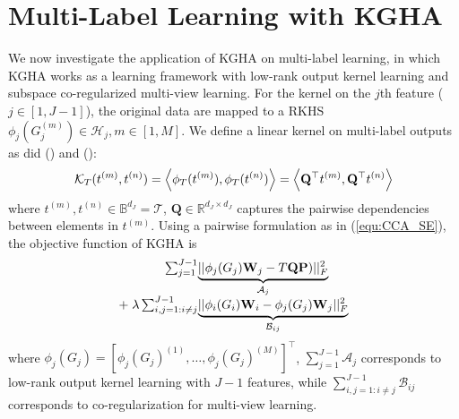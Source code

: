 \documentclass[a4paper]{article}
\begin{document}
\section{Multi-Label Learning with KGHA}
\label{sec:multi-label}
We now investigate the application of KGHA on multi-label learning, in which 
KGHA works as a learning framework with low-rank output kernel learning and subspace co-regularized multi-view learning. For the kernel 
on the $j$th feature ($j\in[1,J-1]$), the original data are mapped to a RKHS $\phi_j(G_j^{(m)})\in \mathcal{H}_j, m\in[1,M]$.  We define a linear kernel on multi-label outputs as did
\citeauthor{Hariharan_icml_2010} (\citeyear{Hariharan_icml_2010}) and \citeauthor{output_kernel} (\citeyear{output_kernel}): 
\begin{equation}
    \small
        \mathcal{K}_T (t^{(m)}, t^{(n)})  =  \left\langle \phi_T (t^{(m)}),\phi_T(t^{(n)})\right\rangle
=\left\langle \mathbf{Q}^\top t^{(m)},\mathbf{Q}^\top t^{(n)} \right\rangle 
\end{equation}
where $t^{(m)},t^{(n)}\in \mathbb{B}^{d_J}=\mathcal{T}$, $\mathbf{Q}\in\mathbb{R}^{d_J\times d_J} $ captures the pairwise dependencies between elements in $t^{(m)}$.  
Using a pairwise formulation as in (\ref{equ:CCA_SE}), the objective function of KGHA is
\begin{equation}
    \begin{array}{r@{}l}
    \sum_{j=1}^{J-1} & \underbrace{||\phi_j (G_j)\mathbf{W}_j-T\mathbf{Q}\mathbf{P})||_F^2}_{\mathcal{A}_j} \\
    +\;\lambda \sum_{i,j=1:i\neq j} ^{J-1} & \underbrace{||\phi_i (G_i)\mathbf{W}_i-\phi_j (G_j)\mathbf{W}_j||_F^2}_{\mathcal{B}_{ij}}
    \end{array}
\label{equ:pairwise-objective}
\end{equation}
where $\phi_j(G_j)=[\phi_j(G_j)^{(1)},\ldots,\phi_j(G_j)^{(M)}]^\top$, $\sum_{j=1}^{J-1} \mathcal{A}_j$ corresponds to low-rank output kernel learning 
with $J-1$ features, while $\sum_{i,j=1:i \neq j}^{J-1}\mathcal{B}_{ij}$ corresponds to co-regularization for multi-view learning. 
\end{document}
